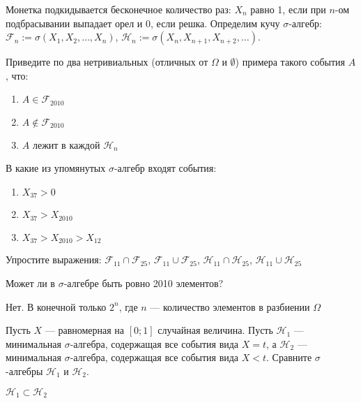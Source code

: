 \begin{problem}
Монетка подкидывается бесконечное количество раз: $X_{n}$ равно 1, если при $ n $-ом подбрасывании выпадает орел и 0, если решка. Определим кучу $ \sigma $-алгебр: $\mathcal{F}_{n}:=\sigma(X_{1},X_{2},\ldots,X_{n})$, $\mathcal{H}_{n}:=\sigma(X_{n},X_{n+1},X_{n+2},\ldots)$.

Приведите по два нетривиальных (отличных от $\Omega$ и $\emptyset$) примера такого события $A$, что:

\begin{enumerate}
\item $ A\in \mathcal{F}_{2010} $
\item $ A\notin \mathcal{F}_{2010} $
\item $A$ лежит в каждой $\mathcal{H}_{n}$
\end{enumerate}

В какие из упомянутых $ \sigma $-алгебр входят события:
\begin{enumerate}
\item $ X_{37}>0$
\item $ X_{37}>X_{2010}$
\item $ X_{37}>X_{2010}>X_{12}$
\end{enumerate}

Упростите выражения: $ \mathcal{F}_{11}\cap \mathcal{F}_{25} $, $ \mathcal{F}_{11}\cup \mathcal{F}_{25} $, $ \mathcal{H}_{11}\cap \mathcal{H}_{25} $, $ \mathcal{H}_{11}\cup \mathcal{H}_{25} $

\begin{sol}

\end{sol}
\end{problem}

\begin{problem}
Может ли в $ \sigma $-алгебре быть ровно 2010 элементов?

\begin{sol}
Нет. В конечной только $2^n$, где $n$ — количество элементов в разбиении $\Omega$
\end{sol}
\end{problem}

\begin{problem}
Пусть $X$ — равномерная на $ [0;1] $ случайная величина. Пусть $ \mathcal{H}_{1} $ — минимальная $ \sigma $-алгебра, содержащая все события вида $ X=t $, а $ \mathcal{H}_{2} $ — минимальная $ \sigma $-алгебра, содержащая все события вида $X<t$. Сравните $\sigma$-алгебры $ \mathcal{H}_{1} $ и $ \mathcal{H}_{2} $.

\begin{sol}
$ \mathcal{H}_{1} \subset \mathcal{H}_{2} $
\end{sol}
\end{problem}

